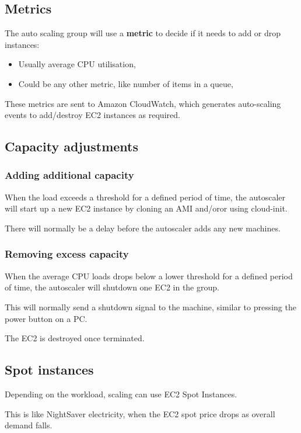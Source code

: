 \documentclass[slides]{pgnotes}
\begin{document}
\subsection{Metrics}

The auto scaling group will use a \textbf{metric} to decide if it needs to add or drop instances:
\begin{itemize}
\item Usually average CPU utilisation,
\item Could be any other metric, like number of items in a queue,
\end{itemize}
These metrics are sent to Amazon CloudWatch, which generates auto-scaling events to add/destroy EC2 instances as required.

\subsection{Capacity adjustments}

\subsubsection{Adding additional capacity}

When the load exceeds a threshold for a defined period of time, the autoscaler will start up a new EC2 instance by cloning an AMI and/oror using cloud-init.

There will normally be a delay before the autoscaler adds any new machines.

\subsubsection{Removing excess capacity}

When the average CPU loads drops below a lower threshold for a defined period of time, the autoscaler will shutdown one EC2 in the group.

This will normally send a shutdown signal to the machine, similar to pressing the power button on a PC.

The EC2 is destroyed once terminated.

\subsection{Spot instances}

Depending on the workload, scaling can use EC2 Spot Instances.

This is like NightSaver electricity, when the EC2 spot price drops as overall demand falls.
\end{document}
